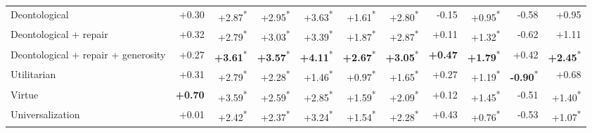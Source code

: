\begin{table}[t]
\begin{tabular}{lrrrrrrrrrr}
Deontological & +0.30 & +2.87\textsuperscript{*} & +2.95\textsuperscript{*} & +3.63\textsuperscript{*} & +1.61\textsuperscript{*} & +2.80\textsuperscript{*} & -0.15 & +0.95\textsuperscript{*} & -0.58 & +0.95 \\
Deontological + repair & +0.32 & +2.79\textsuperscript{*} & +3.03\textsuperscript{*} & +3.39\textsuperscript{*} & +1.87\textsuperscript{*} & +2.87\textsuperscript{*} & +0.11 & +1.32\textsuperscript{*} & -0.62 & +1.11 \\
Deontological + repair + generosity & +0.27 & \textbf{+3.61}\textsuperscript{*} & \textbf{+3.57}\textsuperscript{*} & \textbf{+4.11}\textsuperscript{*} & \textbf{+2.67}\textsuperscript{*} & \textbf{+3.05}\textsuperscript{*} & \textbf{+0.47} & \textbf{+1.79}\textsuperscript{*} & +0.42 & \textbf{+2.45}\textsuperscript{*} \\
Utilitarian & +0.31 & +2.79\textsuperscript{*} & +2.28\textsuperscript{*} & +1.46\textsuperscript{*} & +0.97\textsuperscript{*} & +1.65\textsuperscript{*} & +0.27 & +1.19\textsuperscript{*} & \textbf{-0.90}\textsuperscript{*} & +0.68 \\
Virtue & \textbf{+0.70} & +3.59\textsuperscript{*} & +2.59\textsuperscript{*} & +2.85\textsuperscript{*} & +1.59\textsuperscript{*} & +2.09\textsuperscript{*} & +0.12 & +1.45\textsuperscript{*} & -0.51 & +1.40\textsuperscript{*} \\
Universalization & +0.01 & +2.42\textsuperscript{*} & +2.37\textsuperscript{*} & +3.24\textsuperscript{*} & +1.54\textsuperscript{*} & +2.28\textsuperscript{*} & +0.43 & +0.76\textsuperscript{*} & -0.53 & +1.07\textsuperscript{*} \\
\bottomrule
\end{tabular}
\end{table}
